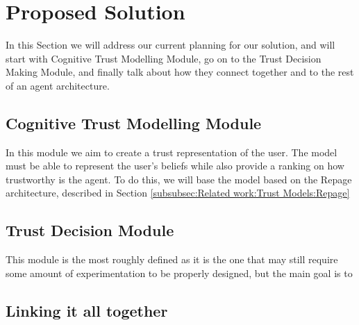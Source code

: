 \section{Proposed Solution}
\label{sec:Solution}
In this Section we will address our current planning for our solution, and will start with Cognitive Trust Modelling Module, go on to the Trust Decision Making Module, and finally talk about how they connect together and to the rest of an agent architecture.


\subsection{Cognitive Trust Modelling Module}
\label{subsec:Solution:Trust Assessment Module}
In this module we aim to create a trust representation of the user. The model must be able to represent the user's beliefs while also provide a ranking on how trustworthy is the agent. To do this, we will base the model based on the Repage architecture, described in Section \ref{subsubsec:Related work:Trust Models:Repage}



\subsection{Trust Decision Module}
\label{subsec:Solution:Trust Decision Making Module}
This module is the most roughly defined as it is the one that may still require some amount of experimentation to be properly designed, but the main goal is to 


\subsection{Linking it all together}
\label{subsec:Solution:Linking all together}